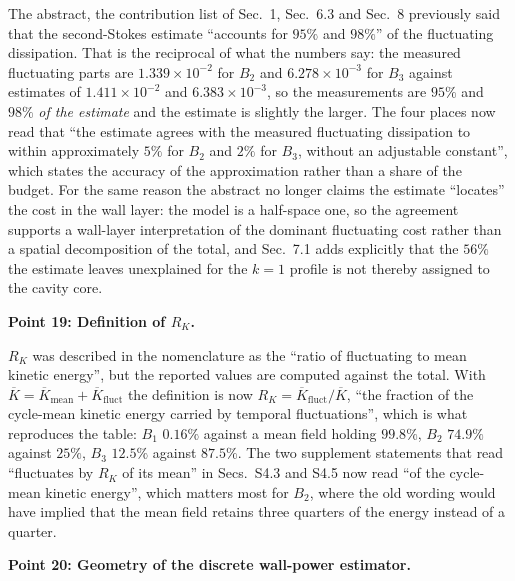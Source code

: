 \documentclass[11pt,a4paper]{article}
\begin{document}
The abstract, the contribution list of Sec.~1, Sec.~6.3 and Sec.~8 previously said
that the second-Stokes estimate ``accounts for $95\%$ and $98\%$'' of the
fluctuating dissipation. That is the reciprocal of what the numbers say: the
measured fluctuating parts are $1.339\times10^{-2}$ for $B_2$ and
$6.278\times10^{-3}$ for $B_3$ against estimates of $1.411\times10^{-2}$ and
$6.383\times10^{-3}$, so the measurements are $95\%$ and $98\%$ \emph{of the
estimate} and the estimate is slightly the larger. The four places now read that
``the estimate agrees with the measured fluctuating dissipation to within
approximately $5\%$ for $B_2$ and $2\%$ for $B_3$, without an adjustable
constant'', which states the accuracy of the approximation rather than a share of
the budget. For the same reason the abstract no longer claims the estimate
``locates'' the cost in the wall layer: the model is a half-space one, so the
agreement supports a wall-layer interpretation of the dominant fluctuating cost
rather than a spatial decomposition of the total, and Sec.~7.1 adds explicitly
that the $56\%$ the estimate leaves unexplained for the $k=1$ profile is not
thereby assigned to the cavity core.

\vspace{1em}

\noindent\textbf{Point 19: Definition of \(R_K\).}

$R_K$ was described in the nomenclature as the ``ratio of fluctuating to mean
kinetic energy'', but the reported values are computed against the total. With
$\overline K=\overline K_{\mathrm{mean}}+\overline K_{\mathrm{fluct}}$ the
definition is now
$R_K=\overline K_{\mathrm{fluct}}/\overline K$, ``the fraction of the cycle-mean
kinetic energy carried by temporal fluctuations'', which is what reproduces the
table: $B_1$ $0.16\%$ against a mean field holding $99.8\%$, $B_2$ $74.9\%$
against $25\%$, $B_3$ $12.5\%$ against $87.5\%$. The two supplement statements
that read ``fluctuates by $R_K$ of its mean'' in Secs.~S4.3 and S4.5 now read
``of the cycle-mean kinetic energy'', which matters most for $B_2$, where the old
wording would have implied that the mean field retains three quarters of the
energy instead of a quarter.

\vspace{1em}

\noindent\textbf{Point 20: Geometry of the discrete wall-power estimator.}
\end{document}
